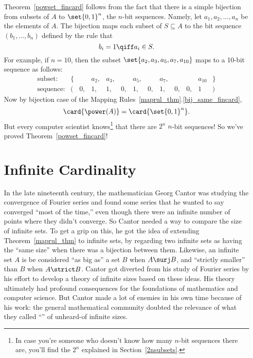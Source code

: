 Theorem~\ref{powset_fincard} follows from the fact that there is a
simple bijection from subsets of $A$ to $\set{0,1}^n$, the $n$-bit
sequences.  Namely, let $a_1, a_2, \dots, a_n$ be the elements of $A$.
The bijection maps each subset of $S \subseteq A$ to the bit sequence
$(b_1, \dots, b_n)$ defined by the rule that
\[
b_i = 1 \qiff a_i \in S.
\]
For example, if $n = 10$, then the subset $\set{a_2, a_3, a_5, a_7,
  a_{10}}$ maps to a 10-bit sequence as follows: %
\[
\begin{array}{rrrrrrrrrrrrr}
\text{subset:} & \{ & & a_2, & a_3, & & a_5, & & a_7, & & & a_{10} &
\} \\ \text{sequence:} & ( & 0, & 1, & 1, & 0, & 1, & 0, & 1, & 0, &
0, & 1 & )
\end{array}
\]
Now by bijection case of the Mapping Rules~\ref{maprul_thm}.\eqref{bij_same_fincard},
\[
\card{\power(A)} = \card{\set{0,1}^n}.
\]
But every computer scientist knows\footnote{In case you're someone who
  doesn't know how many $n$-bit sequences there are, you'll find the
  $2^n$ explained in Section~\ref{2nsubsets}.}
  that there are $2^n$ $n$-bit sequences!  So we've proved
  Theorem~\ref{powset_fincard}!
\begin{problem}
\practiceproblems
{}

\classproblems
{}

\end{problem}

\section{Infinite Cardinality}\label{infinite_sec}

In the late nineteenth century, the mathematician Georg Cantor was
studying the convergence of Fourier series and found some series that
he wanted to say converged ``most of the time,'' even though there
were an infinite number of points where they didn't converge.  So
Cantor needed a way to compare the size of infinite sets.  To get a
grip on this, he got the idea of extending Theorem~\ref{maprul_thm} to
infinite sets, by regarding two infinite sets as having the ``same
size'' when there was a bijection between them.  Likewise, an infinite
set $A$ is be considered ``as big as'' a set $B$ when $A \surj
B$, and ``strictly smaller'' than $B$ when $A \strict B$.  Cantor got
diverted from his study of Fourier series by his effort to develop a
theory of infinite sizes based on these ideas.  His theory ultimately
had profound consequences for the foundations of mathematics and
computer science.  But Cantor made a lot of enemies in his own time
because of his work: the general mathematical community doubted the
relevance of what they called ``'' of
unheard-of infinite sizes.

